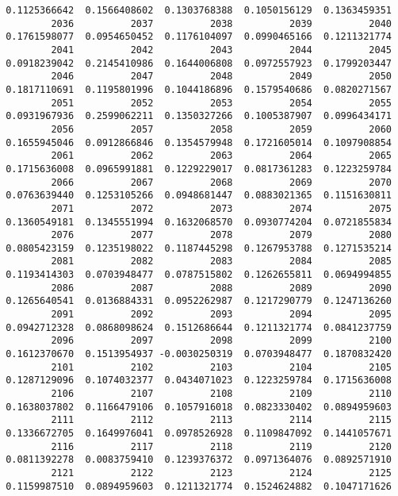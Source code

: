 \documentclass[
  letterpaper,
  DIV=11,
  numbers=noendperiod]{scrreprt}
\begin{document}
\begin{verbatim}
 0.1125366642  0.1566408602  0.1303768388  0.1050156129  0.1363459351 
         2036          2037          2038          2039          2040 
 0.1761598077  0.0954650452  0.1176104097  0.0990465166  0.1211321774 
         2041          2042          2043          2044          2045 
 0.0918239042  0.2145410986  0.1644006808  0.0972557923  0.1799203447 
         2046          2047          2048          2049          2050 
 0.1817110691  0.1195801996  0.1044186896  0.1579540686  0.0820271567 
         2051          2052          2053          2054          2055 
 0.0931967936  0.2599062211  0.1350327266  0.1005387907  0.0996434171 
         2056          2057          2058          2059          2060 
 0.1655945046  0.0912866846  0.1354579948  0.1721605014  0.1097908854 
         2061          2062          2063          2064          2065 
 0.1715636008  0.0965991881  0.1229229017  0.0817361283  0.1223259784 
         2066          2067          2068          2069          2070 
 0.0763639440  0.1253105266  0.0948681447  0.0883021365  0.1151630811 
         2071          2072          2073          2074          2075 
 0.1360549181  0.1345551994  0.1632068570  0.0930774204  0.0721855834 
         2076          2077          2078          2079          2080 
 0.0805423159  0.1235198022  0.1187445298  0.1267953788  0.1271535214 
         2081          2082          2083          2084          2085 
 0.1193414303  0.0703948477  0.0787515802  0.1262655811  0.0694994855 
         2086          2087          2088          2089          2090 
 0.1265640541  0.0136884331  0.0952262987  0.1217290779  0.1247136260 
         2091          2092          2093          2094          2095 
 0.0942712328  0.0868098624  0.1512686644  0.1211321774  0.0841237759 
         2096          2097          2098          2099          2100 
 0.1612370670  0.1513954937 -0.0030250319  0.0703948477  0.1870832420 
         2101          2102          2103          2104          2105 
 0.1287129096  0.1074032377  0.0434071023  0.1223259784  0.1715636008 
         2106          2107          2108          2109          2110 
 0.1638037802  0.1166479106  0.1057916018  0.0823330402  0.0894959603 
         2111          2112          2113          2114          2115 
 0.1336672705  0.1649976041  0.0978526928  0.1109847092  0.1441057671 
         2116          2117          2118          2119          2120 
 0.0811392278  0.0083759410  0.1239376372  0.0971364076  0.0892571910 
         2121          2122          2123          2124          2125 
 0.1159987510  0.0894959603  0.1211321774  0.1524624882  0.1047171626 

\end{verbatim}
\end{document}
